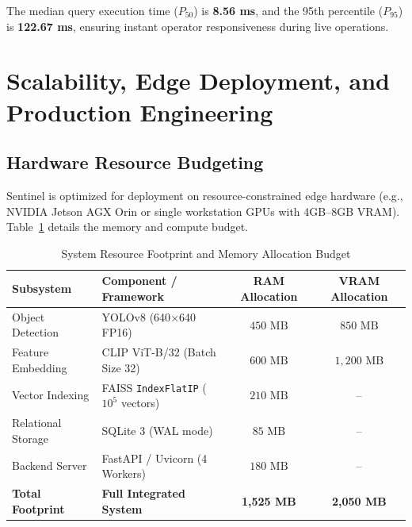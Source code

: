 \documentclass[12pt,a4paper]{article}
\begin{document}
The median query execution time ($P_{50}$) is \textbf{8.56 ms}, and the 95th percentile ($P_{95}$) is \textbf{122.67 ms}, ensuring instant operator responsiveness during live operations.

\section{Scalability, Edge Deployment, and Production Engineering}

\subsection{Hardware Resource Budgeting}
Sentinel is optimized for deployment on resource-constrained edge hardware (e.g., NVIDIA Jetson AGX Orin or single workstation GPUs with 4GB--8GB VRAM). Table~\ref{tab:resources} details the memory and compute budget.

\begin{table}[htbp]
\centering
\caption{System Resource Footprint and Memory Allocation Budget}
\label{tab:resources}
\fontsize{10pt}{12pt}\selectfont
\begin{tabularx}{\textwidth}{lXcc}
\toprule
\textbf{Subsystem} & \textbf{Component / Framework} & \textbf{RAM Allocation} & \textbf{VRAM Allocation} \\
\midrule
Object Detection & YOLOv8 (640$\times$640 FP16) & $450\text{ MB}$ & $850\text{ MB}$ \\
Feature Embedding & CLIP ViT-B/32 (Batch Size 32) & $600\text{ MB}$ & $1,200\text{ MB}$ \\
Vector Indexing & FAISS \texttt{IndexFlatIP} ($10^5$ vectors) & $210\text{ MB}$ & -- \\
Relational Storage & SQLite 3 (WAL mode) & $85\text{ MB}$ & -- \\
Backend Server & FastAPI / Uvicorn (4 Workers) & $180\text{ MB}$ & -- \\
\midrule
\textbf{Total Footprint} & \textbf{Full Integrated System} & \textbf{1,525 MB} & \textbf{2,050 MB} \\
\bottomrule
\end{tabularx}
\end{table}
\end{document}
